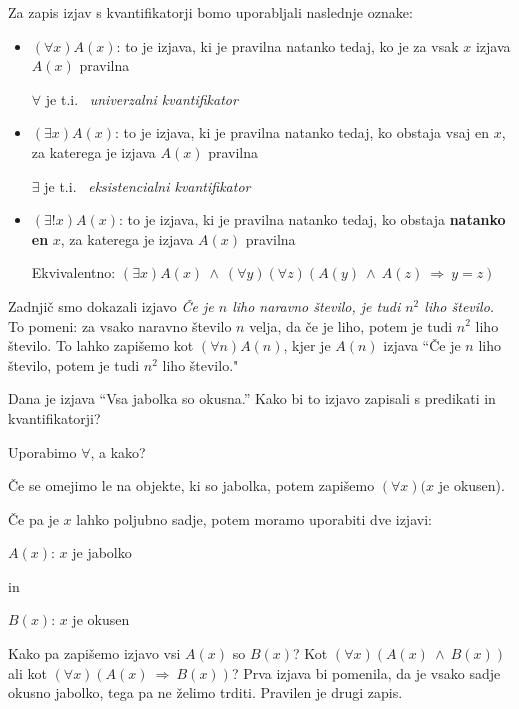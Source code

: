 \documentclass[11pt,paper=b5,footinclude,headinclude]{scrbook} %
\newcounter{example}
\def\inn {{~\wedge~}}
\def\sledi {{~\Rightarrow~}}
\begin{document}
Za zapis izjav s kvantifikatorji bomo uporabljali naslednje oznake:
\begin{itemize}
  \item
  $(\forall x) A(x)$: to je izjava, ki je pravilna natanko tedaj, ko je za vsak $x$ izjava $A(x)$ pravilna

$\forall$ je t.i.~\emph{ univerzalni kvantifikator}
  \item
  $(\exists  x) A(x)$: to je izjava, ki je pravilna natanko tedaj, ko obstaja vsaj en $x$, za katerega je izjava $A(x)$ pravilna

$\exists$ je t.i.~\emph{ eksistencialni kvantifikator}

  \item
  $(\exists!  x) A(x)$: to je izjava, ki je pravilna natanko tedaj, ko obstaja \textbf{ natanko en} $x$, za katerega je izjava $A(x)$ pravilna

Ekvivalentno: $(\exists x)A(x) \inn (\forall y)(\forall z)(A(y) \inn A(z) \sledi y = z)$
\end{itemize}

\begin{example*}
Zadnjič smo dokazali izjavo \emph{ Če je $n$ liho naravno število, je tudi $n^2$ liho število.}
To pomeni: za vsako naravno število $n$ velja, da če je liho, potem je tudi $n^2$ liho število.
To lahko zapišemo kot $(\forall n)A(n)$, kjer je $A(n)$ izjava ``Če je $n$ liho število, potem je tudi $n^2$ liho število."
\end{example*}

\medskip
\begin{sloppypar}
\begin{example*}
Dana je izjava ``Vsa jabolka so okusna.''
Kako bi to izjavo zapisali s predikati in kvantifikatorji?

Uporabimo $\forall$, a kako?

Če se omejimo le na objekte, ki so jabolka, potem zapišemo $(\forall x)(x$ je okusen).

Če pa je $x$ lahko poljubno sadje, potem moramo uporabiti dve izjavi:

$A(x)$: $x$ je jabolko

 in

$B(x)$: $x$ je okusen

Kako pa zapišemo izjavo vsi $A(x)$ so $B(x)$? Kot $(\forall x)(A(x)\inn B(x))$
ali kot $(\forall x)(A(x) \sledi B(x))$?
Prva izjava bi pomenila, da je vsako sadje okusno jabolko, tega pa ne želimo trditi. Pravilen je drugi zapis.
\end{example*}
\end{sloppypar}
\end{document}
